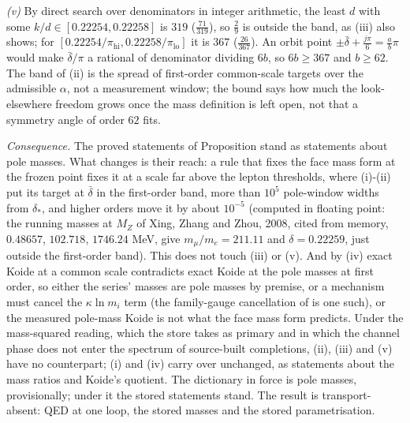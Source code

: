 \emph{(v)} By direct search over denominators in integer arithmetic, the least $d$ with some $k/d \in [0.22254, 0.22258]$ is $319$ ($\tfrac{71}{319}$), so $\tfrac29$ is outside the band, as (iii) also shows; for $[0.22254/\pi_{\mathrm{hi}}, 0.22258/\pi_{\mathrm{lo}}]$ it is $367$ ($\tfrac{26}{367}$). An orbit point $\pm\bar{\delta} + \tfrac{j\pi}{6} = \tfrac{a}{b}\pi$ would make $\bar{\delta}/\pi$ a rational of denominator dividing $6b$, so $6b \ge 367$ and $b \ge 62$. The band of (ii) is the spread of first-order common-scale targets over the admissible $\alpha$, not a measurement window; the bound says how much the look-elsewhere freedom grows once the mass definition is left open, not that a symmetry angle of order $62$ fits.

\emph{Consequence.} The proved statements of Proposition  stand as statements about pole masses. What changes is their reach: a rule that fixes the face mass form at the frozen point fixes it at a scale far above the lepton thresholds, where (i)-(ii) put its target at $\bar{\delta}$ in the first-order band, more than $10^{5}$ pole-window widths from $\delta_{*}$, and higher orders move it by about $10^{-5}$ (computed in floating point: the running masses at $M_{Z}$ of Xing, Zhang and Zhou, 2008, cited from memory, $0.48657$, $102.718$, $1746.24$ MeV, give $m_{\mu}/m_{e} = 211.11$ and $\delta = 0.22259$, just outside the first-order band). This does not touch (iii) or (v). And by (iv) exact Koide at a common scale contradicts exact Koide at the pole masses at first order, so either the series' masses are pole masses by premise, or a mechanism must cancel the $\kappa\ln m_{i}$ term (the family-gauge cancellation of \cite{Sumino2009} is one such), or the measured pole-mass Koide is not what the face mass form predicts. Under the mass-squared reading, which the store takes as primary and in which the channel phase does not enter the spectrum of source-built completions, (ii), (iii) and (v) have no counterpart; (i) and (iv) carry over unchanged, as statements about the mass ratios and Koide's quotient. The dictionary in force is pole masses, provisionally; under it the stored statements stand. The result is transport-absent: QED at one loop, the stored masses and the stored parametrisation.
